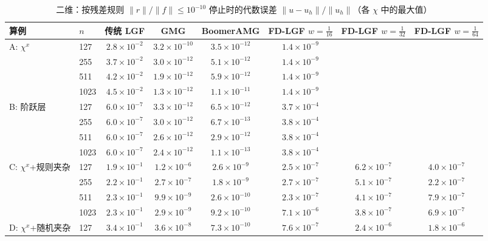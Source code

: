 \begin{table}[H]\centering\small
\caption{二维：按残差规则 $\|r\|/\|f\|\le10^{-10}$ 停止时的代数误差 $\|u-u_h\|/\|u_h\|$（各 $\chi$ 中的最大值）}\label{tab:err2d}
\begin{adjustbox}{max width=\textwidth}
\begin{tabular}{llcccccc}
\toprule
算例 & $n$ & 传统 LGF & GMG & BoomerAMG & FD-LGF $w{=}\frac1{16}$ & FD-LGF $w{=}\frac1{32}$ & FD-LGF $w{=}\frac1{64}$ \\
\midrule
A: $\chi^x$ & 127 & $2.8{\times}10^{-2}$ & $3.2{\times}10^{-10}$ & $3.5{\times}10^{-12}$ & $1.4{\times}10^{-9}$ &  &  \\
 & 255 & $3.7{\times}10^{-2}$ & $3.0{\times}10^{-12}$ & $5.1{\times}10^{-12}$ & $1.4{\times}10^{-9}$ &  &  \\
 & 511 & $4.2{\times}10^{-2}$ & $1.9{\times}10^{-12}$ & $5.9{\times}10^{-12}$ & $1.4{\times}10^{-9}$ &  &  \\
 & 1023 & $4.5{\times}10^{-2}$ & $1.3{\times}10^{-12}$ & $1.1{\times}10^{-11}$ & $1.4{\times}10^{-9}$ &  &  \\
\midrule
B: 阶跃层 & 127 & $6.0{\times}10^{-7}$ & $3.3{\times}10^{-12}$ & $6.5{\times}10^{-12}$ & $3.7{\times}10^{-4}$ &  &  \\
 & 255 & $6.0{\times}10^{-7}$ & $3.0{\times}10^{-12}$ & $6.7{\times}10^{-13}$ & $3.8{\times}10^{-4}$ &  &  \\
 & 511 & $6.0{\times}10^{-7}$ & $2.6{\times}10^{-12}$ & $2.9{\times}10^{-12}$ & $3.8{\times}10^{-4}$ &  &  \\
 & 1023 & $6.0{\times}10^{-7}$ & $2.4{\times}10^{-12}$ & $1.1{\times}10^{-13}$ & $3.8{\times}10^{-4}$ &  &  \\
\midrule
C: $\chi^x$+规则夹杂 & 127 & $1.9{\times}10^{-1}$ & $1.2{\times}10^{-6}$ & $2.6{\times}10^{-9}$ & $2.5{\times}10^{-7}$ & $6.2{\times}10^{-7}$ & $4.0{\times}10^{-7}$ \\
 & 255 & $2.2{\times}10^{-1}$ & $2.7{\times}10^{-7}$ & $1.8{\times}10^{-9}$ & $2.7{\times}10^{-7}$ & $5.1{\times}10^{-7}$ & $2.2{\times}10^{-7}$ \\
 & 511 & $2.3{\times}10^{-1}$ & $9.9{\times}10^{-9}$ & $2.6{\times}10^{-10}$ & $2.3{\times}10^{-7}$ & $4.1{\times}10^{-7}$ & $7.9{\times}10^{-7}$ \\
 & 1023 & $2.3{\times}10^{-1}$ & $2.9{\times}10^{-9}$ & $9.2{\times}10^{-10}$ & $7.1{\times}10^{-6}$ & $3.8{\times}10^{-7}$ & $6.9{\times}10^{-7}$ \\
\midrule
D: $\chi^x$+随机夹杂 & 127 & $3.4{\times}10^{-1}$ & $3.6{\times}10^{-8}$ & $7.3{\times}10^{-10}$ & $7.6{\times}10^{-7}$ & $2.4{\times}10^{-6}$ & $1.8{\times}10^{-6}$ \\

\end{tabular}
\end{adjustbox}
\end{table}
